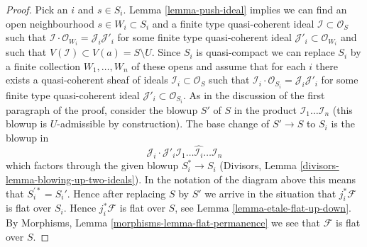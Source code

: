 \begin{proof}
\medskip\noindent
Pick an $i$ and $s \in S_i$. Lemma \ref{lemma-push-ideal}
implies we can find an open neighbourhood $s \in W_i \subset S_i$
and a finite type quasi-coherent ideal $\mathcal{I} \subset \mathcal{O}_S$
such that $\mathcal{I} \cdot \mathcal{O}_{W_i} = \mathcal{J}_i \mathcal{J}'_i$
for some finite type quasi-coherent ideal
$\mathcal{J}'_i \subset \mathcal{O}_{W_i}$
and such that $V(\mathcal{I}) \subset V(a) = S \setminus U$.
Since $S_i$ is quasi-compact we can replace $S_i$ by a finite collection
$W_1, \ldots, W_n$ of these opens and assume that for each $i$ there exists
a quasi-coherent sheaf of ideals $\mathcal{I}_i \subset \mathcal{O}_S$ such
that $\mathcal{I}_i \cdot \mathcal{O}_{S_i} = \mathcal{J}_i \mathcal{J}'_i$
for some finite type quasi-coherent ideal
$\mathcal{J}'_i \subset \mathcal{O}_{S_i}$.
As in the discussion of the first paragraph of the proof, consider the
blowup $S'$ of $S$ in the product $\mathcal{I}_1 \ldots \mathcal{I}_n$
(this blowup is $U$-admissible by construction). The base change of $S' \to S$
to $S_i$ is the blowup in
$$
\mathcal{J}_i \cdot
\mathcal{J}'_i \mathcal{I}_1 \ldots \hat{\mathcal{I}_i} \ldots \mathcal{I}_n
$$
which factors through the given blowup $S_i^* \to S_i$
(Divisors, Lemma \ref{divisors-lemma-blowing-up-two-ideals}). In the notation
of the diagram above this means that $S_i^{\prime *} = S_i'$. Hence
after replacing $S$ by $S'$ we arrive in the situation that
$j_i^*\mathcal{F}$ is flat over $S_i$. Hence $j_i^*\mathcal{F}$ is flat
over $S$, see
Lemma \ref{lemma-etale-flat-up-down}.
By Morphisms, Lemma \ref{morphisms-lemma-flat-permanence}
we see that $\mathcal{F}$ is flat over $S$.
\end{proof}
